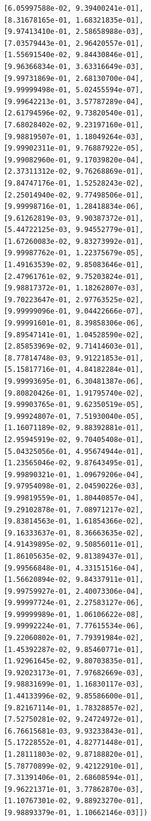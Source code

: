 \documentclass[
  11pt,
  letterpaper,
  DIV=11,
  numbers=noendperiod]{scrartcl}
\begin{document}
\begin{verbatim}
       [6.05997588e-02, 9.39400241e-01],
       [8.31678165e-01, 1.68321835e-01],
       [9.97413410e-01, 2.58658988e-03],
       [7.03579443e-01, 2.96420557e-01],
       [1.55691540e-02, 9.84430846e-01],
       [9.96366834e-01, 3.63316649e-03],
       [9.99731869e-01, 2.68130700e-04],
       [9.99999498e-01, 5.02455594e-07],
       [9.99642213e-01, 3.57787289e-04],
       [2.61794596e-02, 9.73820540e-01],
       [7.68028402e-02, 9.23197160e-01],
       [9.98819507e-01, 1.18049264e-03],
       [9.99902311e-01, 9.76887922e-05],
       [9.99082960e-01, 9.17039820e-04],
       [2.37311312e-02, 9.76268869e-01],
       [9.84747176e-01, 1.52528243e-02],
       [2.25014940e-02, 9.77498506e-01],
       [9.99998716e-01, 1.28418834e-06],
       [9.61262819e-03, 9.90387372e-01],
       [5.44722125e-03, 9.94552779e-01],
       [1.67260083e-02, 9.83273992e-01],
       [9.99987762e-01, 1.22375679e-05],
       [1.49163539e-02, 9.85083646e-01],
       [2.47961761e-02, 9.75203824e-01],
       [9.98817372e-01, 1.18262807e-03],
       [9.70223647e-01, 2.97763525e-02],
       [9.99999096e-01, 9.04422666e-07],
       [9.99991601e-01, 8.39858306e-06],
       [9.89547141e-01, 1.04528590e-02],
       [2.85853969e-02, 9.71414603e-01],
       [8.77814748e-03, 9.91221853e-01],
       [5.15817716e-01, 4.84182284e-01],
       [9.99993695e-01, 6.30481387e-06],
       [9.80820426e-01, 1.91795740e-02],
       [9.99903765e-01, 9.62350519e-05],
       [9.99924807e-01, 7.51930040e-05],
       [1.16071189e-02, 9.88392881e-01],
       [2.95945919e-02, 9.70405408e-01],
       [5.04325056e-01, 4.95674944e-01],
       [1.23565046e-02, 9.87643495e-01],
       [9.99890321e-01, 1.09679206e-04],
       [9.97954098e-01, 2.04590226e-03],
       [9.99819559e-01, 1.80440857e-04],
       [9.29102878e-01, 7.08971217e-02],
       [9.83814563e-01, 1.61854366e-02],
       [9.16333637e-01, 8.36663635e-02],
       [4.91439895e-02, 9.50856011e-01],
       [1.86105635e-02, 9.81389437e-01],
       [9.99566848e-01, 4.33151516e-04],
       [1.56620894e-02, 9.84337911e-01],
       [9.99759927e-01, 2.40073306e-04],
       [9.99997724e-01, 2.27583127e-06],
       [9.99999989e-01, 1.06106622e-08],
       [9.99992224e-01, 7.77615534e-06],
       [9.22060802e-01, 7.79391984e-02],
       [1.45392287e-02, 9.85460771e-01],
       [1.92961645e-02, 9.80703835e-01],
       [9.92023173e-01, 7.97682669e-03],
       [9.98831699e-01, 1.16830117e-03],
       [1.44133996e-02, 9.85586600e-01],
       [9.82167114e-01, 1.78328857e-02],
       [7.52750281e-02, 9.24724972e-01],
       [6.76615681e-03, 9.93233843e-01],
       [5.17228552e-01, 4.82771448e-01],
       [1.28111803e-02, 9.87188820e-01],
       [5.78770899e-02, 9.42122910e-01],
       [7.31391406e-01, 2.68608594e-01],
       [9.96221371e-01, 3.77862870e-03],
       [1.10767301e-02, 9.88923270e-01],
       [9.98893379e-01, 1.10662146e-03]])
\end{verbatim}
\end{document}
